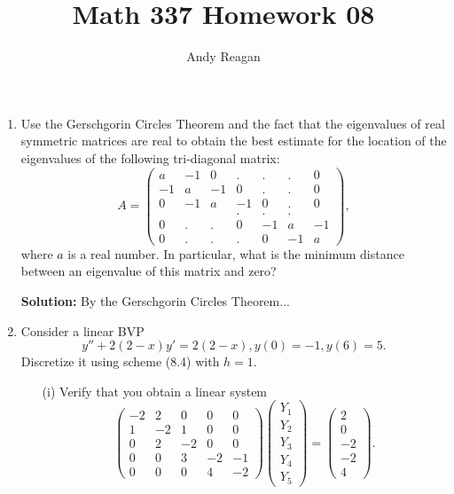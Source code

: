 \documentclass[11pt]{article}
\author{Andy Reagan}
\title{Math 337 Homework 08}
\begin{document}
\maketitle

\begin{enumerate}

\item Use the Gerschgorin Circles Theorem and the fact that the eigenvalues of real symmetric matrices are real to obtain the best estimate for the location of the eigenvalues of the following tri-diagonal matrix:
\[ A = \left ( \begin{array}{ccccccc} a & -1 & 0 & . & . & . & 0\\
-1 & a & -1 & 0 & . & . & 0\\
0 & -1 & a & -1 & 0 & . & 0\\
 &  &  & . & . & . & \\
0 & . & . & 0 & -1 & a & -1\\
0 & . & . & . & 0 & -1 & a\end{array} \right ) , \]
where $a$ is a real number.
In particular, what is the minimum distance between an eigenvalue of this matrix and zero?

\bigskip
\textbf{Solution:} By the Gerschgorin Circles Theorem...




\item Consider a linear BVP
\[ y'' + 2(2-x)y' = 2(2-x), y(0) = -1, y(6) = 5.\]
Discretize it using scheme (8.4) with $h = 1$.
\begin{enumerate}

\item[(i)] Verify that you obtain a linear system
\[ \left ( \begin{array}{ccccc} -2 & 2 & 0 & 0 & 0\\
1 & -2 & 1 & 0 & 0\\
0 & 2 & -2 & 0 & 0\\
0 & 0 & 3 & -2 & -1\\
0 & 0 & 0 & 4 & -2\end{array} \right ) \left (\begin{array}{c} Y_1 \\
Y_2\\
Y_3\\
Y_4\\
Y_5\end{array} \right ) = \left (\begin{array}{r} 2 \\
0\\
-2\\
-2\\
4\end{array} \right ).\]


\end{enumerate}
\end{enumerate}
\end{document}
